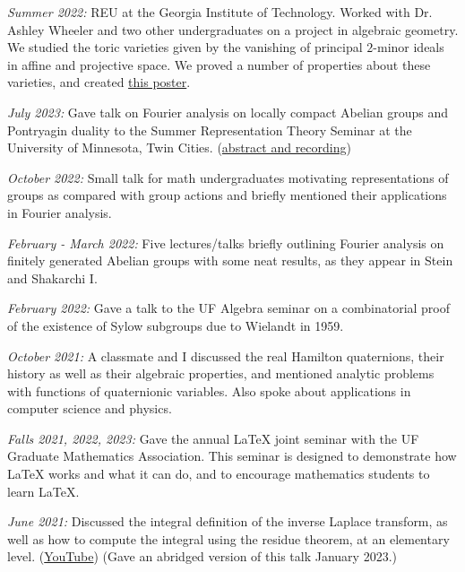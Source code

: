 \documentclass[11pt]{article}
\begin{document}
\textsl{Summer 2022:} REU at the Georgia Institute of Technology. Worked with Dr. Ashley Wheeler and two other undergraduates on a project in algebraic geometry. We studied the toric varieties given by the vanishing of principal $2$-minor ideals in affine and projective space. We proved a number of properties about these varieties, and created {\color{blue}\href{https://math.gatech.edu/sites/default/files/images/boniface-rodriguez-sivakumar-wheeler.pdf}{this poster}}.


\textsl{July 2023:} Gave talk on Fourier analysis on locally compact Abelian groups and Pontryagin duality to the Summer Representation Theory Seminar at the University of Minnesota, Twin Cities. ({\color{blue}\href{https://sites.google.com/umn.edu/robertangarone/ssrts-23}{abstract and recording}})

\textsl{October 2022:} Small talk for math undergraduates motivating representations of groups as compared with group actions and briefly mentioned their applications in Fourier analysis. 

\textsl{February - March 2022:} Five lectures/talks briefly outlining Fourier analysis on finitely generated Abelian groups with some neat results, as they appear in Stein and Shakarchi I. 

\textsl{February 2022:} Gave a talk to the UF Algebra seminar on a combinatorial proof of the existence of Sylow subgroups due to Wielandt in 1959.

\textsl{October 2021:} A classmate and I discussed the real Hamilton quaternions, their history as well as their algebraic properties, and mentioned analytic problems with functions of quaternionic variables. Also spoke about applications in computer science and physics.

\textsl{Falls 2021, 2022, 2023:} Gave the annual \LaTeX\hspace{1pt} joint seminar with the UF Graduate Mathematics Association. This seminar is designed to demonstrate how \LaTeX\hspace{1pt} works and what it can do, and to encourage mathematics students to learn \LaTeX\hspace{1pt}.

\textsl{June 2021:} Discussed the integral definition of the inverse Laplace transform, as well as how to compute the integral using the residue theorem, at an elementary level. ({\color{blue}\href{https://youtu.be/20Xbrit2chw}{YouTube}}) (Gave an abridged version of this talk January 2023.)
\end{document}
